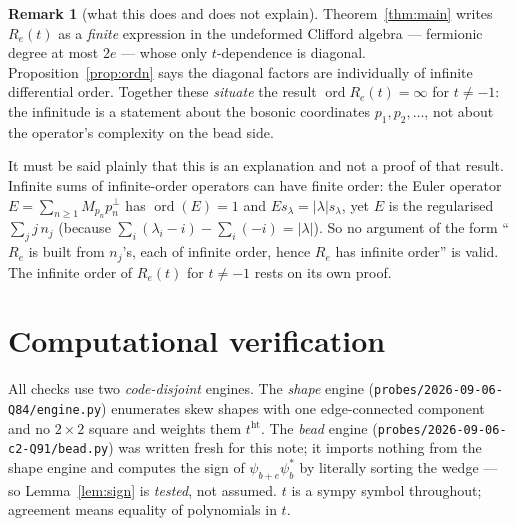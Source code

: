 \documentclass[11pt]{article}
\theoremstyle{definition}
\newtheorem{remark}[theorem]{Remark}
\DeclareMathOperator{\ord}{ord}
\newcommand{\hgt}{\operatorname{ht}}          %
\newcommand{\Mult}[1]{M_{#1}}
\begin{document}
\begin{remark}[what this does and does not explain]
Theorem~\ref{thm:main} writes $R_e(t)$ as a \emph{finite} expression in the
undeformed Clifford algebra --- fermionic degree at most $2e$ --- whose only
$t$-dependence is diagonal.  Proposition~\ref{prop:ordn} says the diagonal factors
are individually of infinite differential order.  Together these \emph{situate} the
result $\ord R_e(t)=\infty$ for $t\neq-1$: the infinitude is a statement about the
bosonic coordinates $p_1,p_2,\dots$, not about the operator's complexity on the
bead side.

It must be said plainly that this is an explanation and not a proof of that result.
Infinite sums of infinite-order operators can have finite order: the Euler operator
$E=\sum_{n\ge1}\Mult{p_n}p_n^{\perp}$ has $\ord(E)=1$ and $Es_\lambda=|\lambda|
s_\lambda$, yet $E$ is the regularised $\sum_j j\,n_j$ (because
$\sum_i(\lambda_i-i)-\sum_i(-i)=|\lambda|$).  So no argument of the form ``$R_e$ is
built from $n_j$'s, each of infinite order, hence $R_e$ has infinite order'' is
valid.  The infinite order of $R_e(t)$ for $t\ne-1$ rests on its own proof.
\end{remark}

\section{Computational verification}

All checks use two \emph{code-disjoint} engines.  The \emph{shape} engine
(\texttt{probes/2026-09-06-Q84/engine.py}) enumerates skew shapes with one
edge-connected component and no $2\times2$ square and weights them $t^{\hgt}$.
The \emph{bead} engine (\texttt{probes/2026-09-06-c2-Q91/bead.py}) was written
fresh for this note; it imports nothing from the shape engine and computes the
sign of $\psi_{b+e}\psi_b^{*}$ by literally sorting the wedge --- so
Lemma~\ref{lem:sign} is \emph{tested}, not assumed.  $t$ is a sympy symbol
throughout; agreement means equality of polynomials in $t$.
\end{document}
